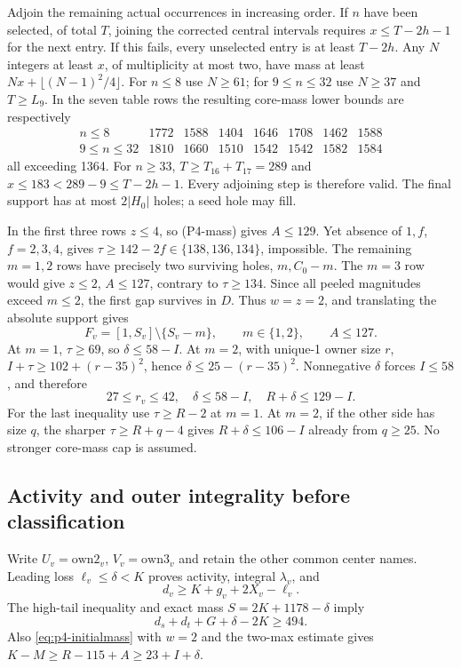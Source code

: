 \documentclass[11pt,letterpaper]{article}
\theoremstyle{definition}\newtheorem{definition}[theorem]{Definition}
\begin{document}
Adjoin the remaining actual occurrences in increasing order. If $n$
have been selected, of total $T$, joining the corrected central intervals
requires $x\le T-2h-1$ for the next entry. If this fails, every unselected
entry is at least $T-2h$. Any $N$ integers at least $x$, of multiplicity at
most two, have mass at least $Nx+\lfloor(N-1)^2/4\rfloor$.
For $n\le8$ use $N\ge61$; for $9\le n\le32$ use $N\ge37$ and
$T\ge L_9$. In the seven table rows the resulting core-mass lower bounds
are respectively
\[
\begin{array}{c|rrrrrrr}
n\le8&1772&1588&1404&1646&1708&1462&1588\\
9\le n\le32&1810&1660&1510&1542&1542&1582&1584
\end{array}
\]
all exceeding 1364. For $n\ge33$, $T\ge T_{16}+T_{17}=289$ and
$x\le183<289-9\le T-2h-1$. Every adjoining step is therefore valid.
The final support has at most $2|H_0|$ holes; a seed hole may fill.

In the first three rows $z\le4$, so (P4-mass) gives $A\le129$.
Yet absence of $1,f$, $f=2,3,4$, gives
$\tau\ge142-2f\in\{138,136,134\}$, impossible. The remaining $m=1,2$
rows have precisely two surviving holes, $m,C_0-m$. The $m=3$ row would
give $z\le2$, $A\le127$, contrary to $\tau\ge134$.
Since all peeled magnitudes exceed $m\le2$, the first gap survives in
$D$. Thus $w=z=2$, and translating the absolute support gives
\begin{equation}
 F_v=[1,S_v]\setminus\{S_v-m\},\qquad m\in\{1,2\},\qquad
 A\le127.                                           \label{eq:p4-target}
\end{equation}
At $m=1$, $\tau\ge69$, so $\delta\le58-I$.
At $m=2$, with unique-1 owner size $r$,
$I+\tau\ge102+(r-35)^2$, hence
$\delta\le25-(r-35)^2$.
Nonnegative $\delta$ forces $I\le58$, and therefore
\begin{equation}
 27\le r_v\le42,\quad \delta\le58-I,\quad
 R+\delta\le129-I.                                \label{eq:p4-baseline}
\end{equation}
For the last inequality use $\tau\ge R-2$ at $m=1$.
At $m=2$, if the other side has size $q$, the sharper
$\tau\ge R+q-4$ gives $R+\delta\le106-I$ already from $q\ge25$.
No stronger core-mass cap is assumed.

\subsection{Activity and outer integrality before classification}\label{subsec:p4-activity}
Write $U_v=\mathrm{own2}_v$, $V_v=\mathrm{own3}_v$ and retain the other
common center names. Leading loss $\ell_v\le\delta<K$ proves activity,
integral $\lambda_v$, and
\begin{equation}
 d_v\ge K+g_v+2X_v-\ell_v.                         \label{eq:p4-lead}
\end{equation}
The high-tail inequality and exact mass $S=2K+1178-\delta$ imply
\begin{equation}
 d_s+d_t+G+\delta-2K\ge494.                        \label{eq:p4-tail}
\end{equation}
Also \eqref{eq:p4-initialmass} with $w=2$ and the two-max estimate gives
$K-M\ge R-115+A\ge23+I+\delta$.
\end{document}
